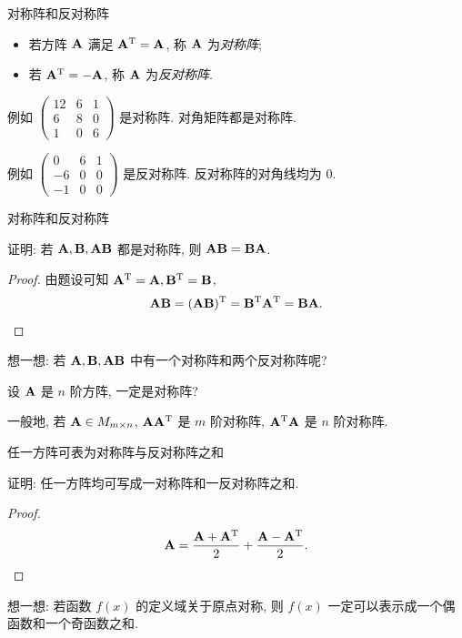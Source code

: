 \begin{frame}{对称阵和反对称阵}
	\begin{definition}
		\begin{itemize}
			\item 若方阵 ${\mathbf{A}}$ 满足 ${\mathbf{A}}^{\mathrm{T}}={\mathbf{A}}$, 称 ${\mathbf{A}}$ 为\emph{对称阵};
			\item 若 ${\mathbf{A}}^{\mathrm{T}}=-{\mathbf{A}}$, 称 ${\mathbf{A}}$ 为\emph{反对称阵}.
		\end{itemize}
	\end{definition}
	\onslide<+->
	例如 $\begin{pmatrix}
		12&6&1\\
		6&8&0\\
		1&0&6
	\end{pmatrix}$
	是对称阵.
	\onslide<+->
	对角矩阵都是对称阵.

	\onslide<+->
	例如 $\begin{pmatrix}
		0&6&1\\
		-6&0&0\\
		-1&0&0
	\end{pmatrix}$
	是反对称阵.
	\onslide<+->
	反对称阵的对角线均为 $0$.
\end{frame}


\begin{frame}{对称阵和反对称阵}
	\onslide<+->
	\begin{example}
		证明: 若 ${\mathbf{A}},{\mathbf{B}},{\mathbf{A}}{\mathbf{B}}$ 都是对称阵, 则 ${\mathbf{A}}{\mathbf{B}}={\mathbf{B}}{\mathbf{A}}$.
	\end{example}
	\onslide<+->
	\begin{proof}
		由题设可知 ${\mathbf{A}}^{\mathrm{T}}={\mathbf{A}},{\mathbf{B}}^{\mathrm{T}}={\mathbf{B}}$,
		\[{\mathbf{A}}{\mathbf{B}}=({\mathbf{A}}{\mathbf{B}})^{\mathrm{T}}={\mathbf{B}}^{\mathrm{T}}{\mathbf{A}}^{\mathrm{T}}={\mathbf{B}}{\mathbf{A}}.\qedhere\]
	\end{proof}
	\onslide<+->
	想一想: 若 ${\mathbf{A}},{\mathbf{B}},{\mathbf{A}}{\mathbf{B}}$ 中有一个对称阵和两个反对称阵呢?
	\onslide<+->
	\begin{exercise}
		设 ${\mathbf{A}}$ 是 $n$ 阶方阵, 一定是对称阵?
	\end{exercise}
	\onslide<+->
	一般地, 若 ${\mathbf{A}}\in M_{m\times n}$, ${\mathbf{A}}{\mathbf{A}}^{\mathrm{T}}$ 是 $m$ 阶对称阵, ${\mathbf{A}}^{\mathrm{T}}{\mathbf{A}}$ 是 $n$ 阶对称阵.
\end{frame}


\begin{frame}{任一方阵可表为对称阵与反对称阵之和}
	\onslide<+->
	\begin{example}
		证明: 任一方阵均可写成一对称阵和一反对称阵之和.
	\end{example}
	\onslide<+->
	\begin{proof}
		\[{\mathbf{A}}=\frac{{\mathbf{A}}+{\mathbf{A}}^{\mathrm{T}}}2+\frac{{\mathbf{A}}-{\mathbf{A}}^{\mathrm{T}}}2.\qedhere\]
	\end{proof}
	\onslide<+->
	想一想: 若函数 $f(x)$ 的定义域关于原点对称, 则 $f(x)$ 一定可以表示成一个偶函数和一个奇函数之和.
\end{frame}

